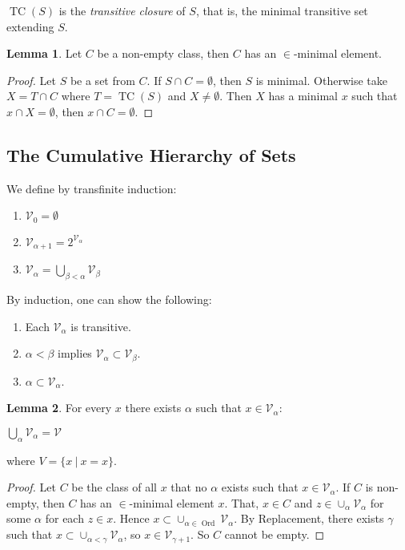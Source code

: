\documentclass[8pt]{article}
\theoremstyle{definition}
\theoremstyle{definition}
\theoremstyle{definition}
\theoremstyle{definition}
\theoremstyle{definition}
\theoremstyle{definition}
\theoremstyle{definition}
\theoremstyle{definition}
\newtheorem{lemma}{Lemma}[section]
\theoremstyle{definition}
\theoremstyle{definition}
\theoremstyle{definition}
\theoremstyle{definition}
\theoremstyle{definition}
\theoremstyle{definition}
\theoremstyle{question}
\begin{document}
$\operatorname{TC}(S)$ is the \emph{transitive closure} of $S$, that is, the minimal transitive set extending $S$.

\begin{lemma}
  Let $C$ be a non-empty class, then $C$ has an $\in$-minimal element.
\end{lemma}

\begin{proof}
  Let $S$ be a set from $C$. If $S \cap C = \emptyset$, then $S$ is minimal.
  Otherwise take $X = T \cap C$ where $T = \operatorname{TC}(S)$ and $X \neq \emptyset$.
  Then $X$ has a minimal $x$ such that $x \cap X = \emptyset$, then $x \cap C = \emptyset$.
\end{proof}

\subsection{The Cumulative Hierarchy of Sets}

We define by transfinite induction:

\begin{enumerate}
  \item $\mathcal{V}_0 = \emptyset$
  \item $\mathcal{V}_{\alpha + 1} = 2^{\mathcal{V}_\alpha}$
  \item $\mathcal{V}_{\alpha} = \bigcup \limits_{\beta < \alpha} \mathcal{V}_{\beta}$
\end{enumerate}

By induction, one can show the following:
\begin{enumerate}
  \item Each $\mathcal{V}_{\alpha}$ is transitive.
  \item $\alpha < \beta$ implies $\mathcal{V}_{\alpha} \subset \mathcal{V}_{\beta}$.
  \item $\alpha \subset \mathcal{V}_{\alpha}$.
\end{enumerate}

\begin{lemma}
  For every $x$ there exists $\alpha$ such that $x \in \mathcal{V}_{\alpha}$:
\begin{center}
  $\bigcup \limits_{\alpha} \mathcal{V}_{\alpha} = \mathcal{V}$
\end{center}
where $V = \{ x \: | \: x = x\}$.
\end{lemma}

\begin{proof}
Let $C$ be the class of all $x$ that no $\alpha$ exists such that $x \in \mathcal{V}_{\alpha}$.
If $C$ is non-empty, then $C$ has an $\in$-minimal element $x$.
That, $x \in C$ and $z \in \cup_{\alpha} \mathcal{V}_{\alpha}$ for some $\alpha$ for each $z \in x$.
Hence $x \subset \cup_{\alpha \in \operatorname{Ord}} \mathcal{V}_{\alpha}$.
By Replacement, there exists $\gamma$ such that $x \subset \cup_{\alpha < \gamma} \mathcal{V}_{\alpha}$, so 
$x \in \mathcal{V}_{\gamma + 1}$. So $C$ cannot be empty.
\end{proof}
\end{document}
